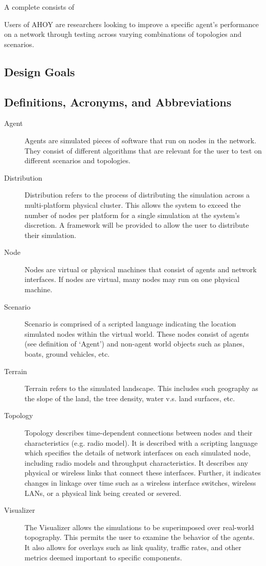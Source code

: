 \documentclass[titlepage]{article}
\begin{document}
A complete consists of 

Users of AHOY are researchers looking to improve a specific agent's performance on a network through testing across varying combinations of topologies and scenarios.

\subsection{Design Goals}
\subsection{Definitions, Acronyms, and Abbreviations}
\begin{description}
\item[Agent]
	Agents are simulated pieces of software that run on nodes in the network. They consist of different algorithms that are relevant for the user to test on different scenarios and topologies.   

\item[Distribution]
	Distribution refers to the process of distributing the simulation across a multi-platform physical cluster.  This allows the system to exceed the number of nodes per platform for a single simulation at the system's discretion.  A framework will be provided to allow the user to distribute their simulation. 	

\item[Node]
	Nodes are virtual or physical machines that consist of agents and network interfaces.  If nodes are virtual, many nodes may run on one physical machine.  

\item[Scenario]
	Scenario is comprised of a scripted language indicating the location simulated nodes within the virtual world. These nodes consist of agents (see definition of `Agent') and non-agent world objects such as planes, boats, ground vehicles, etc. 

\item[Terrain]
	Terrain refers to the simulated landscape.  This includes such geography as the slope of the land, the tree density, water v.s. land surfaces, etc.

\item[Topology]
	Topology describes time-dependent connections between nodes and their characteristics (e.g. radio model). It is described with a scripting language which specifies the details of network interfaces on each simulated node, including radio models and throughput characteristics.  It describes any physical or wireless links that connect these interfaces.  Further, it indicates changes in linkage over time such as a wireless interface switches, wireless LANs, or a physical link being created or severed. 

\item[Visualizer]
	The Visualizer allows the simulations to be superimposed over real-world topography.  This permits the user to examine the behavior of the agents.  It also allows for overlays such as link quality, traffic rates, and other metrics deemed important to specific components.
\end{description}
\end{document}
